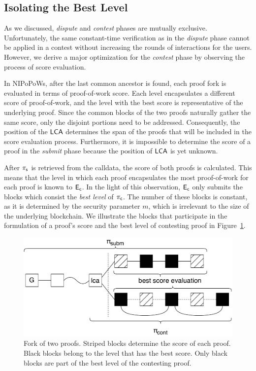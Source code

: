 \subsection{Isolating the Best Level} As we discussed, \emph{dispute}
and \emph{contest} phases are mutually exclusive. Unfortunately, the same
constant-time verification as in the \emph{dispute} phase cannot be applied in a
contest without increasing the rounds of interactions for the users. However,
we derive a major optimization for the \emph{contest} phase by observing the
process of score evaluation.

In NIPoPoWs, after the last common ancestor is found, each proof fork
is evaluated in terms of proof-of-work score. Each level encapsulates a different
score of proof-of-work, and the level with the best score is representative
of the underlying proof. Since the common blocks of the two proofs naturally
gather the same score, only the disjoint portions need to be addressed.
Consequently, the position of the $\mathsf{LCA}$ determines the span of the proofs that
will be included in the score evaluation process. Furthermore, it is impossible
to determine the score of a proof in the \emph{submit} phase because the position
of $\mathsf{LCA}$ is yet unknown.

After $\mathsf{\pi_{s}}$ is retrieved from the calldata, the score of both proofs is
calculated. This means that the level in which each proof encapsulates the
most proof-of-work for each proof is known to $\mathsf{E_{c}}$. In the light of this
observation, $\mathsf{E_{c}}$ only submits the blocks which consist the \emph{best level}
of $\mathsf{\pi_{c}}$. The number of these blocks is constant, as it is determined by the
security parameter $m$, which is irrelevant to the size of the underlying
blockchain. We illustrate the blocks that participate in the formulation of a
proof's score and the best level of contesting proof in
Figure~\ref{fig:score-at-levels}.

\begin{figure}[!h]
    \begin{center}
    \includegraphics[width=0.6\columnwidth]{figures/blocks-of-best-level.pdf}
    \end{center}
    \caption{Fork of two proofs. Striped blocks determine the
    score of each proof. Black blocks belong to the level that
    has the best score. Only black blocks are part of the best level of the
    contesting proof.}
    \label{fig:score-at-levels}
\end{figure}



